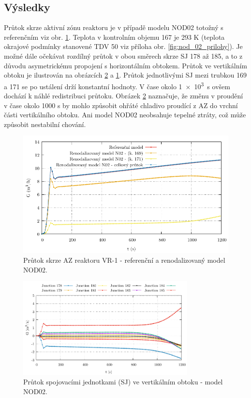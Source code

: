 \subsection{Výsledky}
Průtok skrze aktivní zónu reaktoru je v případě modelu NOD02 totožný s referenčním viz obr. \ref{fig:nod_02_mass_flow_rate_vertical}. Teplota v kontrolním objemu 167 je 293 K (teplota okrajové podmínky stanovené TDV 50 viz příloha obr. \ref{fig:nod_02_prilohy}). Je možné dále očekávat rozdílný průtok v obou směrech skrze SJ 178 až 185, a to z důvodu asymetrickému propojení s horizontálním obtokem. Průtok ve vertikálním obtoku je ilustrován na obrázcích \ref{fig:nod_02_mass_flow_rate_horizontal} a \ref{fig:nod_02_mass_flow_rate_vertical}. Průtok jednotlivými SJ mezi trubkou 169 a 171 se po ustálení drží konstantní hodnoty. V čase okolo \SI{1e3}{s} ovšem dochází k náhlé redistribuci průtoku. Obrázek \ref{fig:nod_02_mass_flow_rate_horizontal} naznačuje, že změnu v proudění v čase okolo 1000 s by mohlo způsobit ohřáté chladivo proudící z AZ do vrchní části vertikálního obtoku. Ani model NOD02 neobsahuje tepelné ztráty, což může způsobit nestabilní chování. 
\begin{figure}[H]
	\centering
	\includegraphics[width=.8\textwidth]{./05_TH_model_VR_1/grafy/nod_02_mass_flow_rate_vertical}
	\caption{Průtok skrze AZ reaktoru VR-1 - referenční a renodalizovaný model NOD02.}
	\label{fig:nod_02_mass_flow_rate_vertical}
\end{figure}
\begin{figure}[H]
	\centering
	\includegraphics[width=0.8\textwidth]{./05_TH_model_VR_1/grafy/nod_02_mass_flow_rate_horizontal.pdf}
	\caption{Průtok spojovacími jednotkami (SJ) ve vertikálním obtoku - model NOD02.}
	\label{fig:nod_02_mass_flow_rate_horizontal}
\end{figure}
